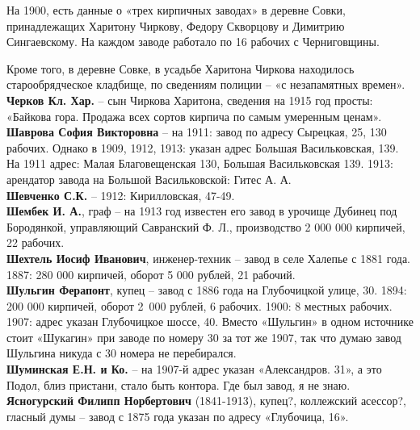 На 1900, есть данные о «трех кирпичных заводах» в деревне Совки, принадлежащих Харитону Чиркову, Федору Скворцову и Димитрию Сингаевскому. На каждом заводе работало по 16 рабочих с Черниговщины.

Кроме того, в деревне Совке, в усадьбе Харитона Чиркова находилось старообрядческое кладбище, по сведениям полиции – «с незапамятных времен».\\

\noindent\textbf{Черков Кл. Хар.} – сын Чиркова Харитона, сведения на 1915 год просты: «Байкова гора. Продажа всех сортов кирпича по самым умеренным ценам».\\

\noindent\textbf{Шаврова София Викторовна} – на 1911: завод по адресу Сырецкая, 25, 130 рабочих. Однако в 1909, 1912, 1913: указан адрес Большая Васильковская, 139. На 1911 адрес: Малая Благовещенская 130, Большая Васильковская 139. 1913: арендатор завода на Большой Васильковской: Гитес А. А.\\

\noindent\textbf{Шевченко С.К.} – 1912: Кирилловская, 47-49.\\ 

\noindent\textbf{Шембек И. А.}, граф – на 1913 год известен его завод в урочище Дубинец под Бородянкой, управляющий Савранский Ф. Л., производство 2 000 000 кирпичей, 22 рабочих.\\

\noindent\textbf{Шехтель Иосиф Иванович}, инженер-техник – завод в селе Халепье с 1881 года. 1887: 280 000 кирпичей, оборот 5 000 рублей, 21 рабочий.\\

\noindent\textbf{Шульгин Ферапонт}, купец – завод с 1886 года на Глубочицкой улице, 30. 1894: 200 000 кирпичей, оборот \mbox{2 000} рублей, 6 рабочих. 1900: 8 местных рабочих. 1907: адрес указан Глубочицкое шоссе, 40. Вместо «Шульгин» в одном источнике стоит «Шукагин» при заводе по номеру 30 за тот же 1907, так что думаю завод Шульгина никуда с 30 номера не перебирался.\\

\noindent\textbf{Шуминская Е.Н. и Ко.} – на 1907-й адрес указан «Александров. 31», а это Подол, близ пристани, стало быть контора. Где был завод, я не знаю.\\

\noindent\textbf{Ясногурский Филипп Норбертович} (1841-1913), купец?, коллежский асессор?, гласный думы – завод с 1875 года указан по адресу «Глубочица, 16». 

